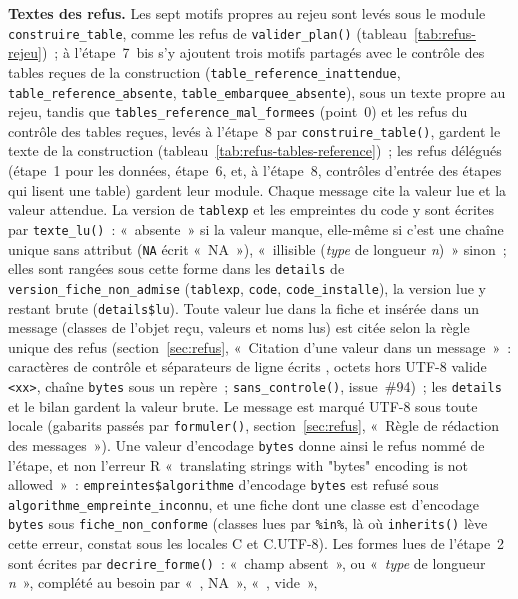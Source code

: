 \documentclass[a4paper,11pt]{article}
\newcommand{\code}[1]{\texttt{\small #1}}
\begin{document}
\medskip
\noindent
\textbf{Textes des refus.} Les sept motifs propres au rejeu sont levés sous
le module \code{construire\_table}, comme les refus de \code{valider\_plan()}
(tableau~\ref{tab:refus-rejeu})~; à l'étape~7~bis s'y ajoutent trois
motifs partagés avec le contrôle des tables reçues de la construction
(\code{table\_reference\_inattendue}, \code{table\_reference\_absente},
\code{table\_embarquee\_absente}), sous un texte propre au rejeu, tandis
que \code{tables\_reference\_mal\_formees} (point~0) et les refus du
contrôle des tables reçues, levés à l'étape~8 par \code{construire\_table()},
gardent le texte de la construction
(tableau~\ref{tab:refus-tables-reference})~; les refus délégués (étape~1 pour les
données, étape~6, et, à l'étape~8, contrôles d'entrée des étapes qui lisent
une table) gardent leur module. Chaque message cite la valeur lue et
la valeur attendue. La version de \code{tablexp} et les empreintes du
code y sont écrites par \code{texte\_lu()}~: «~absente~» si la valeur
manque, elle-même si c'est une chaîne unique sans attribut (\code{NA} écrit
«~NA~»), «~illisible (\emph{type} de longueur \emph{n})~» sinon~; elles
sont rangées sous cette forme dans les \code{details} de
\code{version\_fiche\_non\_admise} (\code{tablexp}, \code{code},
\code{code\_installe}), la version lue y restant brute
(\code{details\$lu}). Toute
valeur lue dans la fiche et insérée dans un message (classes de l'objet
reçu, valeurs et noms lus) est citée selon la règle unique des refus
(section~\ref{sec:refus}, «~Citation d'une valeur dans un message~»~:
caractères de contrôle et séparateurs de ligne écrits \code{<U+XXXX>},
octets hors UTF-8 valide \code{<xx>}, chaîne \code{bytes} sous un repère~;
\code{sans\_controle()}, issue~\#94)~; les \code{details} et le bilan
gardent la valeur brute. Le message est marqué UTF-8 sous toute locale
(gabarits passés par \code{formuler()}, section~\ref{sec:refus},
«~Règle de rédaction des messages~»). Une valeur d'encodage
\code{bytes} donne ainsi le refus nommé de l'étape, et non l'erreur R
«~translating strings with "bytes" encoding is not allowed~»~:
\code{empreintes\$algorithme} d'encodage \code{bytes} est refusé sous
\code{algorithme\_empreinte\_inconnu}, et une fiche dont une classe est
d'encodage \code{bytes} sous \code{fiche\_non\_conforme} (classes lues par
\code{\%in\%}, là où \code{inherits()} lève cette erreur, constat sous les
locales C et C.UTF-8). Les formes lues de l'étape~2 sont
écrites par \code{decrire\_forme()}~: «~champ absent~», ou «~\emph{type} de
longueur \emph{n}~», complété au besoin par «~, NA~», «~, vide~»,
\end{document}

